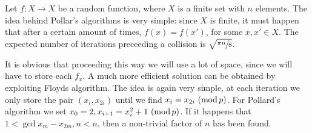 \documentclass{subfiles}
\begin{document}
    Let \(f : X \to X\) be a random function, where \(X\) is a finite set with \(n\) elements.
        The idea behind Pollar's algorithms is very simple:
        since \(X\) is finite, it must happen that after a certain amount of times,
        \(f(x) = f(x')\), for some \(x, x' \in X\).
        The expected number of iterations preceeding a collision is \(\sqrt{\sfrac{\pi n}{8}}\).

    It is obvious that proceeding this way we will use a lot of space, 
        since we will have to store each \(f_{x}\).
        A much more efficient solution can be obtained by exploiting Floyds algorithm.
        The idea is again very simple, at each iteration we only store the pair \((x_{i}, x_{2i})\)
        until we find \(x_{i} = x_{2i} \mod\). For Pollard's algorithm we set \(x_{0} = 2,
        x_{i + 1} = x_{i}^{2} + 1 \mod\). If it happens that \(1 < \gcd{x_{m} - x_{2m}, n} < n\),
        then a non-trivial factor of \(n\) has been found.
\end{document}
